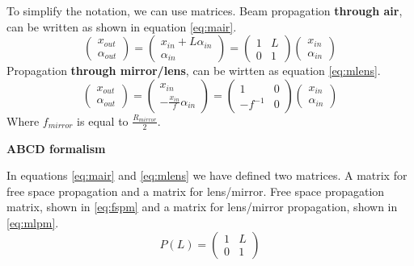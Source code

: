 To simplify the notation, we can use matrices.
Beam propagation \textbf{through air}, can be written as shown in equation \ref{eq:mair}.
\begin{equation}
    \begin{pmatrix}
        x_{out} \\ \alpha_{out}
    \end{pmatrix} = \begin{pmatrix}
        x_{in} + L \alpha_{in} \\ \alpha_{in}
    \end{pmatrix} = \begin{pmatrix}
        1 & L \\ 0 & 1
    \end{pmatrix} \begin{pmatrix}
        x_{in} \\ \alpha_{in}
    \end{pmatrix}
    \label{eq:mair}
\end{equation}
Propagation \textbf{through mirror/lens}, can be wirtten as equation \ref{eq:mlens}.
\begin{equation}
    \begin{pmatrix}
        x_{out} \\ \alpha_{out}
    \end{pmatrix} =     \begin{pmatrix}
        x_{in} \\ -\frac{x_{in}}{f} \alpha_{in}
    \end{pmatrix}  = \begin{pmatrix}
        1 & 0 \\ -f^{-1} & 0
    \end{pmatrix} \begin{pmatrix}
        x_{in} \\ \alpha_{in}
    \end{pmatrix}
    \label{eq:mlens}
\end{equation}
Where $f_{mirror}$ is equal to $\frac{R_{mirror}}{2}$.


\textbf{ABCD formalism}

In equations \ref{eq:mair} and \ref{eq:mlens} we have defined two matrices. A matrix for free space propagation and a matrix for 
lens/mirror. 
Free space propagation matrix, shown in \ref{eq:fspm} and a matrix for lens/mirror propagation, shown in \ref{eq:mlpm}.
\begin{equation}
    P(L) =\begin{pmatrix}
        1 & L \\ 0 & 1
    \end{pmatrix}
    \label{eq:fspm}
\end{equation}

